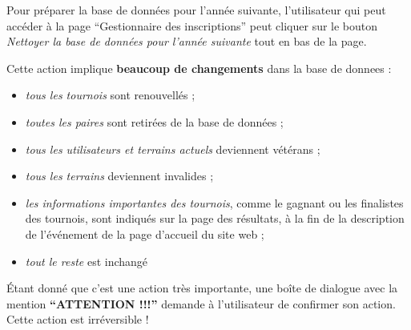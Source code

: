 Pour préparer la base de données pour l'année suivante, l'utilisateur qui peut accéder à la page \enquote{Gestionnaire des inscriptions} peut cliquer sur le bouton \textit{Nettoyer la base de données pour l'année suivante} tout en bas de la page.\newline

Cette action implique \textbf{beaucoup de changements} dans la base de donnees :

\begin{itemize}
\item \textit{tous les tournois} sont renouvellés ;
\item \textit{toutes les paires} sont retirées de la base de données ;
\item \textit{tous les utilisateurs et terrains actuels} deviennent vétérans ;
\item \textit{tous les terrains} deviennent invalides ;
\item \textit{les informations importantes des tournois}, comme le gagnant ou les finalistes des tournois, sont indiqués sur la page des résultats, à la fin de la description de l'événement de la page d'accueil du site web ;
\item \textit{tout le reste} est inchangé
\end{itemize}
\bigskip

Étant donné que c'est une action très importante, une boîte de dialogue avec la mention \textbf{\enquote{ATTENTION !!!}} demande à l'utilisateur de confirmer son action. Cette action est irréversible !